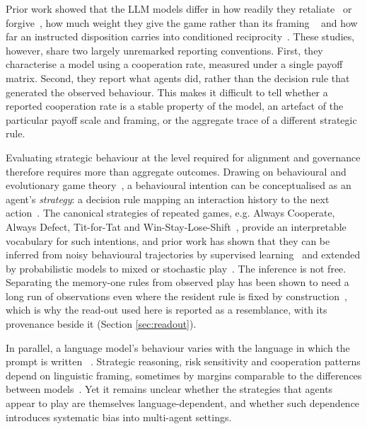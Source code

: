 \documentclass[11pt,a4paper]{article}
\begin{document}
Prior work showed that the LLM models differ
in how readily they retaliate~\cite{akata2025} or 
forgive~\cite{fontana2025nicer}, how much weight they give the game rather than
its framing  ~\cite{loreheydari2024strategic} and how far an instructed
disposition carries into conditioned
reciprocity~\cite{phelps2023investigating}. These studies, however, share two largely unremarked reporting conventions. First, they characterise a model using a cooperation rate, measured under a single payoff matrix. Second, they report what agents did, rather than the decision rule that generated the observed behaviour. This makes it difficult to tell whether a reported cooperation rate is a stable property of the model, an artefact of the particular payoff scale and framing, or the aggregate trace of a different strategic rule.

Evaluating strategic behaviour at the level required for alignment and governance therefore requires more than aggregate outcomes. Drawing on
behavioural and evolutionary game theory~\cite{sigmund:2010bo}, a behavioural
intention can be conceptualised as an agent's \emph{strategy}: a decision rule
mapping an interaction history to the next
action~\cite{han2013intention,diStefanoIntention2023,Han2012ALIFEjournal,fujimoto2019functional}.
The canonical strategies of repeated games, e.g. Always Cooperate, Always Defect,
Tit-for-Tat and Win-Stay-Lose-Shift~\cite{Axelrod1980Effective,sigmund:2010bo},
provide an interpretable vocabulary for such intentions, and prior work has
shown that they can be inferred from noisy behavioural trajectories by
supervised learning~\cite{han2013intention,diStefanoIntention2023} and extended by
probabilistic models to mixed or stochastic play~\cite{inferenceStrategies}.
The inference is not free. Separating the memory-one rules from observed play
has been shown to need a long run of observations even where the resident rule
is fixed by construction~\cite{kim2021win,hilbe2013memory}, which is why the
read-out used here is reported as a resemblance, with its provenance beside it
(Section \ref{sec:readout}).

In parallel, a language model's behaviour varies with the language in which the
prompt is written ~\cite{buscemi2025fairgame}. Strategic reasoning, risk
sensitivity and cooperation patterns depend on linguistic framing, sometimes by
margins comparable to the differences between
models~\cite{loreheydari2024strategic,buscemi2025llms,buscemi2025strategic}.
Yet it remains unclear whether the strategies that agents appear to play are
themselves language-dependent, and whether such dependence introduces systematic
bias into multi-agent settings.
\end{document}
